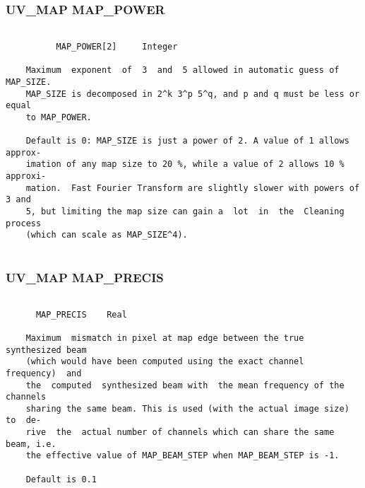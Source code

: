 \subsubsection{UV\_MAP MAP\_POWER}
\begin{verbatim}

          MAP_POWER[2]     Integer

    Maximum  exponent  of  3  and  5 allowed in automatic guess of MAP_SIZE.
    MAP_SIZE is decomposed in 2^k 3^p 5^q, and p and q must be less or equal
    to MAP_POWER.

    Default is 0: MAP_SIZE is just a power of 2. A value of 1 allows approx-
    imation of any map size to 20 %, while a value of 2 allows 10 % approxi-
    mation.  Fast Fourier Transform are slightly slower with powers of 3 and
    5, but limiting the map size can gain a  lot  in  the  Cleaning  process
    (which can scale as MAP_SIZE^4).


\end{verbatim}
\subsubsection{UV\_MAP MAP\_PRECIS}
\begin{verbatim}

      MAP_PRECIS    Real

    Maximum  mismatch in pixel at map edge between the true synthesized beam
    (which would have been computed using the exact channel  frequency)  and
    the  computed  synthesized beam with  the mean frequency of the channels
    sharing the same beam. This is used (with the actual image size) to  de-
    rive  the  actual number of channels which can share the same beam, i.e.
    the effective value of MAP_BEAM_STEP when MAP_BEAM_STEP is -1.

    Default is 0.1

\end{verbatim}
